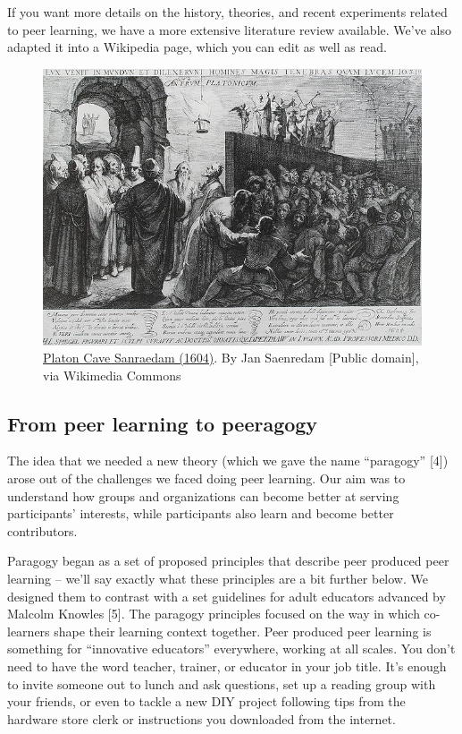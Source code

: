 If you want more details on the history, theories, and recent
experiments related to peer learning, we have a more extensive
literature review available. We've also adapted it into a Wikipedia
page, which you can edit as well as read.

\begin{figure}
\begin{center}
\includegraphics[width=.8\textwidth]{../pictures/plato_cave.jpg}
\end{center}
\caption*{\href{http://commons.wikimedia.org/w/index.php?title=File:Platon\_Cave\_Sanraedam\_1604.jpg\&oldid=68567627}{Platon Cave Sanraedam (1604)}. By Jan Saenredam {[}Public domain{]}, via
Wikimedia Commons}
\end{figure}

\subsection{From peer learning to peeragogy}

The idea that we needed a new theory (which we gave the name
``paragogy'' {[}4{]}) arose out of the challenges we faced doing peer
learning. Our aim was to understand how groups and organizations can
become better at serving participants' interests, while participants
also learn and become better contributors.

Paragogy began as a set of proposed principles that describe peer
produced peer learning -- we'll say exactly what these principles are a
bit further below. We designed them to contrast with a set guidelines
for adult educators advanced by Malcolm Knowles {[}5{]}. The paragogy
principles focused on the way in which co-learners shape their learning
context together. Peer produced peer learning is something for
``innovative educators'' everywhere, working at all scales. You don't
need to have the word teacher, trainer, or educator in your job title.
It's enough to invite someone out to lunch and ask questions, set up a
reading group with your friends, or even to tackle a new DIY project
following tips from the hardware store clerk or instructions you
downloaded from the internet.


